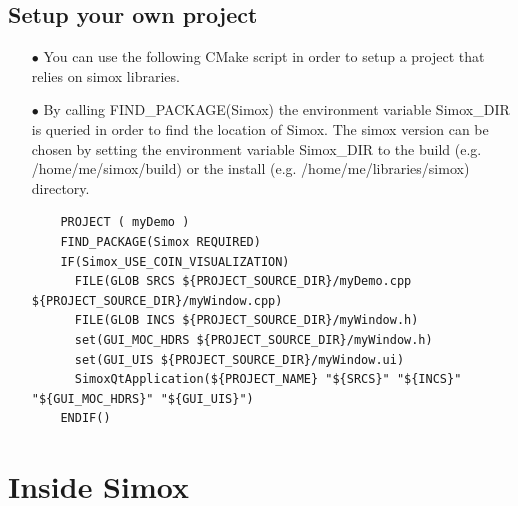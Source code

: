\section{Setup your own project}
\begin{itemize}
\item[$\bullet$] You can use the following CMake script in order to setup a project that relies on simox libraries. 
\item[$\bullet$] By calling FIND\_PACKAGE(Simox) the environment variable Simox\_DIR is queried in order to find the location of Simox. The simox version can be chosen by setting the environment variable Simox\_DIR to the build (e.g. /home/me/simox/build) or the install (e.g. /home/me/libraries/simox) directory. 
\begin{lstlisting}
    PROJECT ( myDemo )
    FIND_PACKAGE(Simox REQUIRED)
    IF(Simox_USE_COIN_VISUALIZATION)
      FILE(GLOB SRCS ${PROJECT_SOURCE_DIR}/myDemo.cpp ${PROJECT_SOURCE_DIR}/myWindow.cpp)
      FILE(GLOB INCS ${PROJECT_SOURCE_DIR}/myWindow.h)
      set(GUI_MOC_HDRS ${PROJECT_SOURCE_DIR}/myWindow.h)
      set(GUI_UIS ${PROJECT_SOURCE_DIR}/myWindow.ui)
      SimoxQtApplication(${PROJECT_NAME} "${SRCS}" "${INCS}" "${GUI_MOC_HDRS}" "${GUI_UIS}")
    ENDIF()
\end{lstlisting}
\end{itemize}

\chapter{Inside Simox}
